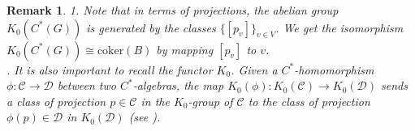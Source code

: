 \documentclass[a4paper,11pt,reqno]{amsart}
\theoremstyle{plain}
\newtheorem{rem}[thm]{Remark}
\theoremstyle{named}
\numberwithin{equation}{section}
\begin{document}
           \begin{rem}
               1. Note that in terms of projections, the abelian group $K_{0}(C^{\ast}(G))$ is generated by the classes $\{[p_{v}]\}_{v\in V}$. We get the isomorphism $K_{0}(C^{\ast}(G))\cong \textrm {coker}(B)$ by mapping $[p_{v}]$ to $v$.\vspace{0.05in}\\
               . It is also important to recall the functor $K_{0}$. Given a $C^{*}$-homomorphism $\phi:\mathcal{C}\rightarrow \mathcal{D}$ between two $C^{\ast}$-algebras, the map $K_{0}(\phi):K_{0}(\mathcal{C})\rightarrow K_{0}(\mathcal{D})$ sends a class of projection $p\in \mathcal{C}$ in the $K_{0}$-group of $\mathcal{C}$ to the class of projection $\phi(p)\in \mathcal{D}$ in $K_{0}(\mathcal{D})$ (see \cite{rordam}).
           \end{rem}
\end{document}
